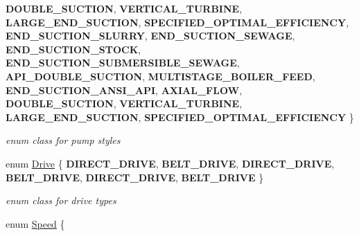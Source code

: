 \begin{DoxyCompactItemize}
{\bfseries D\+O\+U\+B\+L\+E\+\_\+\+S\+U\+C\+T\+I\+ON}, 
{\bfseries V\+E\+R\+T\+I\+C\+A\+L\+\_\+\+T\+U\+R\+B\+I\+NE}, 
{\bfseries L\+A\+R\+G\+E\+\_\+\+E\+N\+D\+\_\+\+S\+U\+C\+T\+I\+ON}, 
{\bfseries S\+P\+E\+C\+I\+F\+I\+E\+D\+\_\+\+O\+P\+T\+I\+M\+A\+L\+\_\+\+E\+F\+F\+I\+C\+I\+E\+N\+CY}, 
\newline
{\bfseries E\+N\+D\+\_\+\+S\+U\+C\+T\+I\+O\+N\+\_\+\+S\+L\+U\+R\+RY}, 
{\bfseries E\+N\+D\+\_\+\+S\+U\+C\+T\+I\+O\+N\+\_\+\+S\+E\+W\+A\+GE}, 
{\bfseries E\+N\+D\+\_\+\+S\+U\+C\+T\+I\+O\+N\+\_\+\+S\+T\+O\+CK}, 
{\bfseries E\+N\+D\+\_\+\+S\+U\+C\+T\+I\+O\+N\+\_\+\+S\+U\+B\+M\+E\+R\+S\+I\+B\+L\+E\+\_\+\+S\+E\+W\+A\+GE}, 
\newline
{\bfseries A\+P\+I\+\_\+\+D\+O\+U\+B\+L\+E\+\_\+\+S\+U\+C\+T\+I\+ON}, 
{\bfseries M\+U\+L\+T\+I\+S\+T\+A\+G\+E\+\_\+\+B\+O\+I\+L\+E\+R\+\_\+\+F\+E\+ED}, 
{\bfseries E\+N\+D\+\_\+\+S\+U\+C\+T\+I\+O\+N\+\_\+\+A\+N\+S\+I\+\_\+\+A\+PI}, 
{\bfseries A\+X\+I\+A\+L\+\_\+\+F\+L\+OW}, 
\newline
{\bfseries D\+O\+U\+B\+L\+E\+\_\+\+S\+U\+C\+T\+I\+ON}, 
{\bfseries V\+E\+R\+T\+I\+C\+A\+L\+\_\+\+T\+U\+R\+B\+I\+NE}, 
{\bfseries L\+A\+R\+G\+E\+\_\+\+E\+N\+D\+\_\+\+S\+U\+C\+T\+I\+ON}, 
{\bfseries S\+P\+E\+C\+I\+F\+I\+E\+D\+\_\+\+O\+P\+T\+I\+M\+A\+L\+\_\+\+E\+F\+F\+I\+C\+I\+E\+N\+CY}
 \}\begin{DoxyCompactList}\small\item\em enum class for pump styles \end{DoxyCompactList}
\item 
\mbox{\label{class_pump_a32bf0ade131a11bb3b3fb374f638e983}} 
enum \hyperlink{class_pump_a32bf0ade131a11bb3b3fb374f638e983}{Drive} \{ \newline
{\bfseries D\+I\+R\+E\+C\+T\+\_\+\+D\+R\+I\+VE}, 
{\bfseries B\+E\+L\+T\+\_\+\+D\+R\+I\+VE}, 
{\bfseries D\+I\+R\+E\+C\+T\+\_\+\+D\+R\+I\+VE}, 
{\bfseries B\+E\+L\+T\+\_\+\+D\+R\+I\+VE}, 
\newline
{\bfseries D\+I\+R\+E\+C\+T\+\_\+\+D\+R\+I\+VE}, 
{\bfseries B\+E\+L\+T\+\_\+\+D\+R\+I\+VE}
 \}\begin{DoxyCompactList}\small\item\em enum class for drive types \end{DoxyCompactList}
\item 
\mbox{\label{class_pump_ae443603074ebca82f0b89209482d10b6}} 
enum \hyperlink{class_pump_ae443603074ebca82f0b89209482d10b6}{Speed} \{ \newline

\end{DoxyCompactItemize}
